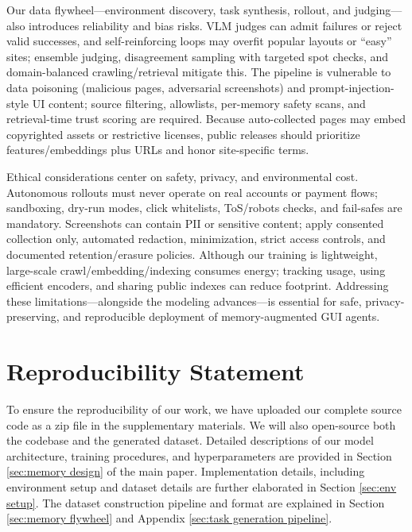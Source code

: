 \documentclass{article} %
\begin{document}
Our data flywheel—environment discovery, task synthesis, rollout, and judging—also introduces reliability and bias risks. VLM judges can admit failures or reject valid successes, and self-reinforcing loops may overfit popular layouts or “easy” sites; ensemble judging, disagreement sampling with targeted spot checks, and domain-balanced crawling/retrieval mitigate this. The pipeline is vulnerable to data poisoning (malicious pages, adversarial screenshots) and prompt-injection-style UI content; source filtering, allowlists, per-memory safety scans, and retrieval-time trust scoring are required. Because auto-collected pages may embed copyrighted assets or restrictive licenses, public releases should prioritize features/embeddings plus URLs and honor site-specific terms.

Ethical considerations center on safety, privacy, and environmental cost. Autonomous rollouts must never operate on real accounts or payment flows; sandboxing, dry-run modes, click whitelists, ToS/robots checks, and fail-safes are mandatory. Screenshots can contain PII or sensitive content; apply consented collection only, automated redaction, minimization, strict access controls, and documented retention/erasure policies. Although our training is lightweight, large-scale crawl/embedding/indexing consumes energy; tracking usage, using efficient encoders, and sharing public indexes can reduce footprint. Addressing these limitations—alongside the modeling advances—is essential for safe, privacy-preserving, and reproducible deployment of memory-augmented GUI agents.

\section*{Reproducibility Statement}
To ensure the reproducibility of our work, we have uploaded our complete source code as a zip file in the supplementary materials. We will also open-source both the codebase and the generated dataset. Detailed descriptions of our model architecture, training procedures, and hyperparameters are provided in Section \ref{sec:memory design} of the main paper. Implementation details, including environment setup and dataset details are further elaborated in Section \ref{sec:env setup}. The dataset construction pipeline and format are explained in Section \ref{sec:memory flywheel} and Appendix \ref{sec:task generation pipeline}.



\end{document}
